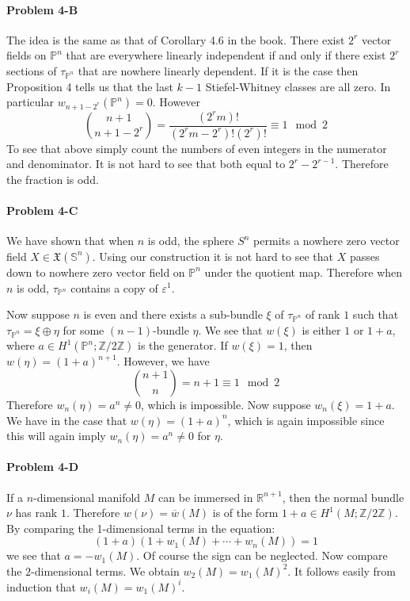 \documentclass[12pt]{article}
\theoremstyle{plain}
\theoremstyle{definition}
\newcommand{\IP}{\mathbb{P}}
\newcommand{\IR}{\mathbb{R}}
\newcommand{\IS}{\mathbb{S}}
\newcommand{\IZ}{\mathbb{Z}}
\newcommand{\<}{\langle}
\renewcommand{\>}{\rangle}
\newcommand{\sm}{\varepsilon}
\begin{document}
\paragraph{Problem 4-B} The idea is the same as that of Corollary 4.6 in the book. There exist $2^r$ vector fields on $\IP^n$ that are everywhere linearly independent if and only if there exist $2^r$ sections of $\tau_{\IP^n}$ that are nowhere linearly dependent. If it is the case then Proposition 4 tells us that the last $ k - 1$ Stiefel-Whitney classes are all zero. In particular $ w_{n + 1 - 2^r} (\IP^n)= 0$. However 
$$ { n + 1 \choose n+1-2^r } = \frac{ (2^r m)! }{(2^r m - 2^r)! (2^r) !} \equiv 1 \mod 2 $$ 
To see that above simply count the numbers of even integers in the numerator and denominator. It is not hard to see that both equal to $2^r - 2^{r - 1}$. Therefore the fraction is odd.  

\paragraph{Problem 4-C}
We have shown that when $n$ is odd, the sphere $S^n$ permits a nowhere zero vector field $X \in \mathfrak{X}(\IS^n)$. Using our construction it is not hard to see that $X$ passes down to nowhere zero vector field on $\IP^n$ under the quotient map. Therefore when $n$ is odd, $\tau_{\IP^n}$ contains a copy of $\sm^1$. 

Now suppose $n$ is even and there exists a sub-bundle $\xi$ of $\tau_{\IP^n}$ of rank $1$ such that $\tau_{\IP^n} = \xi \oplus \eta$ for some $(n - 1)$-bundle $\eta$. We see that $w(\xi)$ is either $1$ or $1 + a$, where $a \in H^1(\IP^n; \IZ/2\IZ)$ is the generator. If $w(\xi) = 1$, then $w(\eta) = (1 + a)^{n + 1}$. However, we have 
$$ { n + 1 \choose n } = n + 1 \equiv 1 \mod 2 $$ Therefore $w_n (\eta) = a^n \neq 0$, which is impossible. Now suppose $w_n (\xi) = 1 + a$. We have in the case that $w(\eta) = (1 + a)^n$, which is again impossible since this will again imply $w_n(\eta) = a^n \neq 0$ for $\eta$. 


\paragraph{Problem 4-D} 
If a $n$-dimensional manifold $M$ can be immersed in $\IR^{n + 1}$, then the normal bundle $\nu$ has rank $1$. Therefore $w(\nu) = \overline{w}(M)$ is of the form $1 + a \in H^1(M; \IZ/2\IZ)$. By comparing the 1-dimensional terms in the equation:
$$ (1 + a)( 1 + w_1(M) + \cdots + w_n(M)) = 1$$
we see that $a = - w_1(M)$. Of course the sign can be neglected. Now compare the $2$-dimensional terms. We obtain $w_2(M) = w_1(M)^2$. It follows easily from induction that $w_i(M) = w_1(M)^i$. 
\end{document}
